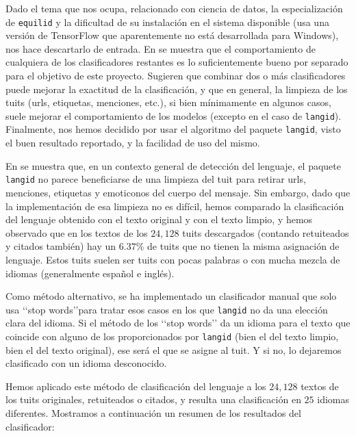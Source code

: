 Dado el tema que nos ocupa, relacionado con ciencia de datos, la especialización 
de {\tt equilid} y la dificultad de su instalación en el sistema disponible
(usa una versión de TensorFlow que aparentemente no está desarrollada para Windows),
nos hace descartarlo de entrada. 
En \cite{langid2} se muestra que el comportamiento de cualquiera de los clasificadores 
restantes es lo suficientemente bueno por
separado para el objetivo de este proyecto. Sugieren que combinar dos o más clasificadores
puede mejorar la exactitud de la clasificación, y que en general, la limpieza de
los tuits (urls, etiquetas, menciones, etc.), si bien mínimamente en algunos casos,
suele mejorar el comportamiento de los modelos (excepto en el caso de {\tt langid}). 
Finalmente, nos hemos decidido por usar el algoritmo del paquete {\tt langid}, visto
el buen resultado reportado, y la facilidad de uso del mismo. 

En \cite{langid2} se muestra que, en un contexto general de detección del lenguaje, 
el paquete {\tt langid} no parece beneficiarse de una limpieza del tuit
para retirar urls, menciones, etiquetas y emoticonos del cuerpo del mensaje.
Sin embargo, dado que la implementación de esa limpieza no 
es difícil, hemos comparado la clasificación del lenguaje obtenido
con el texto original y con el texto limpio, y hemos observado que en los
textos de los $24,128$ tuits descargados (contando retuiteados y citados también)
hay un $6.37$\% de tuits que no tienen la misma asignación de lenguaje. 
Estos tuits suelen ser tuits con pocas palabras
o con mucha mezcla de idiomas (generalmente español e inglés).

Como método alternativo, se ha implementado un clasificador manual que solo
usa \lq\lq stop words\rq\rq para tratar esos casos en los que {\tt langid}
no da una elección clara del idioma. Si el método de los \lq\lq stop words\rq\rq
da un idioma para el texto que coincide con alguno de los proporcionados por 
{\tt langid} (bien el del texto limpio, bien el del texto original), ese será
el que se asigne al tuit. Y si no, lo dejaremos clasificado con un idioma desconocido.

Hemos aplicado este método de clasificación del lenguaje a los $24,128$ textos
de los tuits originales, retuiteados o citados, y resulta una clasificación en $25$
idiomas diferentes. Mostramos a continuación un resumen de los resultados del clasificador:



